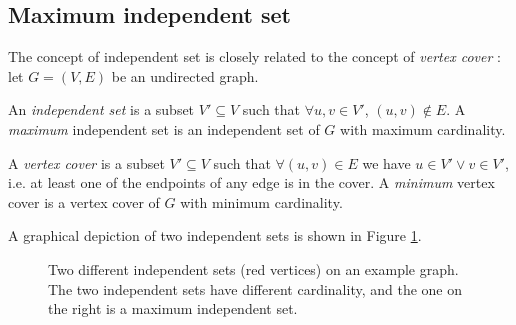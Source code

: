 \subsection{Maximum independent set}

The concept of independent set is closely related to the concept of \emph{vertex cover} \cite{np_book}: let $G=(V,E)$ be an undirected graph.

\begin{definition}
	An \emph{independent set} is a subset $V' \subseteq V$ such that $ \forall u,v \in V'$, $(u,v) \notin E$.
	A \emph{maximum} independent set is an independent set of $G$ with maximum cardinality.
\end{definition}

\begin{definition}
	A \emph{vertex cover} is a subset $V' \subseteq V$ such that $\forall (u,v) \in E$ we have $u \in V' \vee v \in V'$, i.e. at least one of the endpoints of any edge is in the cover. A \emph{minimum} vertex cover is a vertex cover of $G$ with minimum cardinality.
\end{definition}

A graphical depiction of two independent sets is shown in Figure \ref{fig:is_example}.

\begin{figure}[h]
	\centering
{}
	\caption{Two different independent sets (red vertices) on an example graph. The two independent sets have different cardinality, and the one on the right is a maximum independent set.} \label{fig:is_example}
\end{figure}

